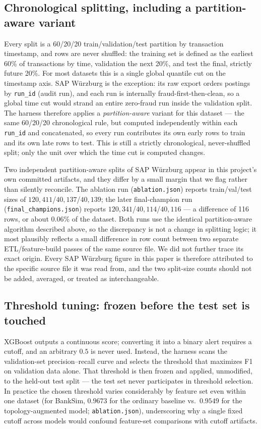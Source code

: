 \subsection{Chronological splitting, including a partition-aware variant}
Every split is a 60/20/20 train/validation/test partition by transaction timestamp, and rows are never shuffled: the training set is defined as the earliest 60\% of transactions by time, validation the next 20\%, and test the final, strictly future 20\%. For most datasets this is a single global quantile cut on the timestamp axis. SAP W\"urzburg is the exception: its raw export orders postings by \texttt{run\_id} (audit run), and each run is internally fraud-first-then-clean, so a global time cut would strand an entire zero-fraud run inside the validation split. The harness therefore applies a \emph{partition-aware} variant for this dataset — the same 60/20/20 chronological rule, but computed independently within each \texttt{run\_id} and concatenated, so every run contributes its own early rows to train and its own late rows to test. This is still a strictly chronological, never-shuffled split; only the unit over which the time cut is computed changes.

Two independent partition-aware splits of SAP W\"urzburg appear in this project's own committed artifacts, and they differ by a small margin that we flag rather than silently reconcile. The ablation run (\texttt{ablation.json}) reports train/val/test sizes of $120{,}411$/$40{,}137$/$40{,}139$; the later final-champion run (\texttt{final\_champions.json}) reports $120{,}341$/$40{,}114$/$40{,}116$ — a difference of 116 rows, or about 0.06\% of the dataset. Both runs use the identical partition-aware algorithm described above, so the discrepancy is not a change in splitting logic; it most plausibly reflects a small difference in row count between two separate ETL/feature-build passes of the same source file. We did not further trace its exact origin. Every SAP W\"urzburg figure in this paper is therefore attributed to the specific source file it was read from, and the two split-size counts should not be added, averaged, or treated as interchangeable.

\subsection{Threshold tuning: frozen before the test set is touched}
XGBoost outputs a continuous score; converting it into a binary alert requires a cutoff, and an arbitrary $0.5$ is never used. Instead, the harness scans the validation-set precision--recall curve and selects the threshold that maximizes F1 on validation data alone. That threshold is then frozen and applied, unmodified, to the held-out test split — the test set never participates in threshold selection. In practice the chosen threshold varies considerably by feature set even within one dataset (for BankSim, $0.9673$ for the ordinary baseline vs.\ $0.9549$ for the topology-augmented model; \texttt{ablation.json}), underscoring why a single fixed cutoff across models would confound feature-set comparisons with cutoff artifacts.

